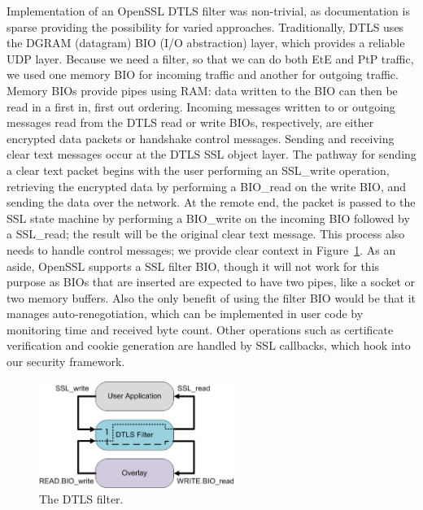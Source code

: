 \documentclass[conference]{IEEEtran}
\begin{document}
Implementation of an OpenSSL DTLS filter was non-trivial, as documentation is
sparse providing the possibility for varied approaches.  Traditionally, DTLS
uses the DGRAM (datagram) BIO (I/O abstraction) layer, which provides a reliable
UDP layer.  Because we need a filter, so that we can do both EtE and PtP traffic,
we used one memory BIO  for incoming traffic and another for outgoing traffic.
Memory BIOs provide pipes using RAM: data written to the BIO can then be read
in a first in, first out ordering.  Incoming messages written to or outgoing
messages read from the DTLS read or write BIOs, respectively, are 
either encrypted data packets or handshake control messages.  Sending and 
receiving clear text messages occur at the DTLS SSL object layer.  The pathway
for sending a clear text packet begins with the user performing an SSL\_write
operation, retrieving the encrypted data by performing a BIO\_read on the write
BIO, and sending the data over the network.  At the remote end, the packet is
passed to the SSL state machine by performing a BIO\_write on the incoming BIO
followed by a SSL\_read; the result will be the original clear text message.
This process also needs to handle control messages; we provide clear context in
Figure~\ref{fig:dtls_filter}.  As an aside, OpenSSL supports a SSL filter
BIO, though it will not work for this purpose as BIOs that are inserted are
expected to have two pipes, like a socket or two memory buffers.  Also the only
benefit of using the filter BIO would be that it manages auto-renegotiation,
which can be implemented in user code by monitoring time and received byte
count.  Other operations such as certificate verification and cookie generation
are handled by SSL callbacks, which hook into our security framework.

\begin{figure}[!h]
\centering
\includegraphics[width=2.5in]{dtls_filter.eps}
\caption{The DTLS filter.}
\label{fig:dtls_filter}
\end{figure}
\end{document}
